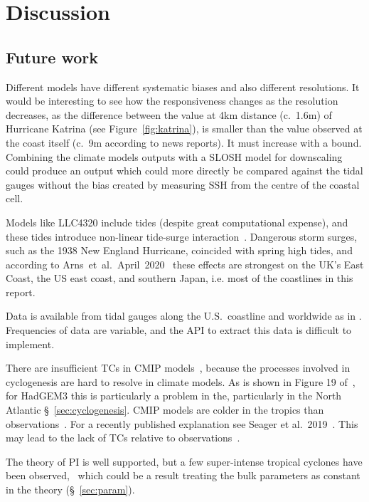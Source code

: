 \section{Discussion}
\label{sec:7_Discussion}

\subsection{Future work}
\label{sec:future}

Different models have different systematic biases
and also different resolutions. It would be interesting to see how
the responsiveness changes as the resolution decreases, as the difference
between the value at 4km distance (c.~1.6m) of Hurricane Katrina (see Figure~\ref{fig:katrina}),
is smaller than the value observed at the coast itself (c.~9m according to news reports).
It must increase with a bound.
Combining the climate models outputs with a SLOSH model for downscaling could produce
an output which could more directly be compared against the tidal gauges
without the bias created by measuring SSH from the centre of the coastal
cell.

Models like LLC4320 include tides (despite great computational expense), and these tides introduce
non-linear tide-surge interaction~\cite{feng2019characteristics, arns2020non}.
Dangerous storm surges, such as the 1938 New England
Hurricane, coincided with spring high tides,
 and according to Arns~et~al.~April~2020~\cite{arns2020non}
these effects are strongest on the UK's East Coast,
the US east coast, and southern Japan, i.e. most of the coastlines in
this report.

Data is available from tidal gauges along the U.S.~coastline and worldwide as
in \cite{tadesse2020data, arns2020non}.
Frequencies of data are variable, and the API to extract this data
is difficult to implement.


There are insufficient TCs in CMIP models~\cite{camargo2013global},
because the processes involved
in cyclogenesis are hard to resolve in climate models.
As is shown in Figure 19 of~\cite{williams2018met},
 for HadGEM3 this is particularly a problem in the,
 particularly in the North Atlantic §~\ref{sec:cyclogenesis}.
CMIP models are colder in the tropics than observations~\cite{camargo2013global}.
For a recently published explanation see Seager et al.~2019~\cite{seager2019strengthening}.
This may lead to the lack of TCs relative to observations~\cite{tomassini2017interaction}.

The theory of PI is well supported, but a few super-intense tropical cyclones have been observed,~\cite{camargo2019tropical}
which could be a result treating the bulk parameters as constant in the theory (§~\ref{sec:param}).

